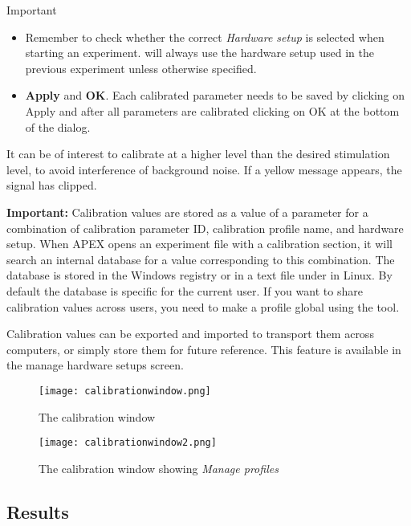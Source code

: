 Important
\begin{itemize}

\item Remember to check whether the correct \emph{Hardware setup}
is selected when starting an experiment. \apex will always use the
hardware setup used in the previous experiment unless otherwise
specified.

\item \textbf{Apply} and \textbf{OK}. Each calibrated parameter
needs to be saved by clicking on Apply and after all parameters
are calibrated clicking on OK at the bottom of the dialog.
\end{itemize}

It can be of interest to calibrate at a higher level than the
desired stimulation level, to avoid interference of background
noise. If a yellow message appears, the signal has clipped.

\textbf{Important:} Calibration values are stored as a value of a parameter for a combination of calibration parameter ID, calibration profile name, and hardware setup. When APEX opens an experiment file with a calibration section, it will search an internal database for a value corresponding to this combination. The database is stored in the Windows registry or in a text file under  in Linux. By default the database is specific for the current user. If you want to share calibration values across users, you need to make a profile global using the  tool. 

Calibration values can be exported and imported to transport them across computers, or simply store them for future reference. This feature is available in the manage hardware setups screen. 


\begin{figure}
 \centering
 \texttt{[image: calibrationwindow.png]}
 \caption{The calibration window}
 \label{fig:calibration}
\end{figure}


\begin{figure}
 \centering
\texttt{[image: calibrationwindow2.png]}
 \caption{The calibration window showing \emph{Manage profiles}}
 \label{fig:calibrationprofiles}
\end{figure}
\label{sec:Calibration}




\subsection{Results}
\label{sec:Results}


